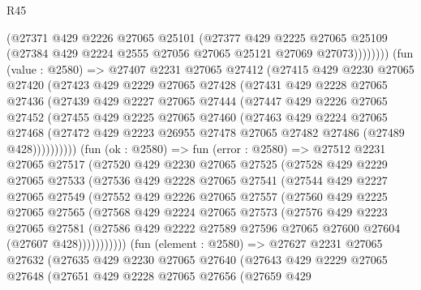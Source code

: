 \begin{lexlean}{R45}
\begin{coremodule}
              (@27371
                @429
                @2226
                @27065
                @25101
                (@27377
                  @429
                  @2225
                  @27065
                  @25109
                  (@27384 @429 @2224 @2555 @27056 @27065 @25121 @27069 @27073))))))))
    (fun (value : @2580) =>
    @27407
      @2231
      @27065
      @27412
      (@27415
        @429
        @2230
        @27065
        @27420
        (@27423
          @429
          @2229
          @27065
          @27428
          (@27431
            @429
            @2228
            @27065
            @27436
            (@27439
              @429
              @2227
              @27065
              @27444
              (@27447
                @429
                @2226
                @27065
                @27452
                (@27455
                  @429
                  @2225
                  @27065
                  @27460
                  (@27463
                    @429
                    @2224
                    @27065
                    @27468
                    (@27472 @429 @2223 @26955 @27478 @27065 @27482 @27486 (@27489 @428))))))))))
    (fun (ok : @2580) =>
    fun (error : @2580) =>
    @27512
      @2231
      @27065
      @27517
      (@27520
        @429
        @2230
        @27065
        @27525
        (@27528
          @429
          @2229
          @27065
          @27533
          (@27536
            @429
            @2228
            @27065
            @27541
            (@27544
              @429
              @2227
              @27065
              @27549
              (@27552
                @429
                @2226
                @27065
                @27557
                (@27560
                  @429
                  @2225
                  @27065
                  @27565
                  (@27568
                    @429
                    @2224
                    @27065
                    @27573
                    (@27576
                      @429
                      @2223
                      @27065
                      @27581
                      (@27586 @429 @2222 @27589 @27596 @27065 @27600 @27604 (@27607 @428)))))))))))
    (fun (element : @2580) =>
    @27627
      @2231
      @27065
      @27632
      (@27635
        @429
        @2230
        @27065
        @27640
        (@27643
          @429
          @2229
          @27065
          @27648
          (@27651
            @429
            @2228
            @27065
            @27656
            (@27659
              @429

\end{coremodule}
\end{lexlean}
